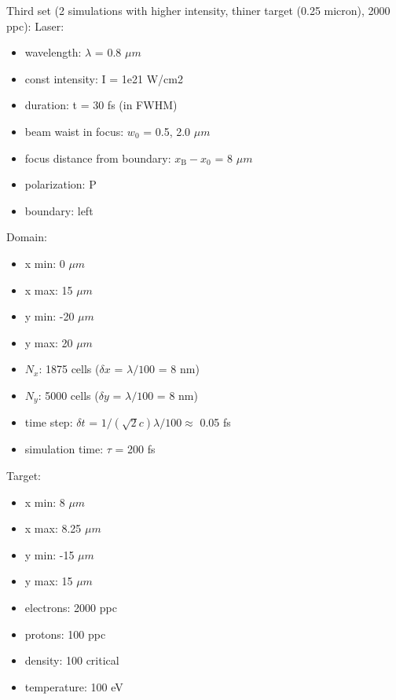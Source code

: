 \noindent
Third set (2 simulations with higher intensity, thiner target (0.25 micron), 2000 ppc):
\noindent
Laser:
\begin{itemize}
	\item wavelength: $ \lambda $ = 0.8 $ \mu m $
	\item const intensity: I = 1e21 W/cm2
	\item duration: t = 30 fs (in FWHM)
	\item beam waist in focus: $ w_0 $ = 0.5, 2.0 $ \mu m $
	\item focus distance from boundary: $ x_\mathrm{B} - x_0 $ = 8 $ \mu m $
	\item polarization: P
	\item boundary: left 
\end{itemize}
Domain:
\begin{itemize}
	\item x min: 0 $ \mu m $
	\item x max: 15 $ \mu m $
	\item y min: -20 $ \mu m $
	\item y max: 20 $ \mu m $
	\item $ N_x $: 1875 cells ($ \delta x $ = $ \lambda/100 $ = 8 nm)
	\item $ N_y $: 5000 cells ($ \delta y $ = $ \lambda/100 $ = 8 nm)
	\item time step: $ \delta t $ = $ 1/(\sqrt{2} c) \lambda /100 \approx $ 0.05 fs 
	\item simulation time: $ \tau $ = 200 fs
\end{itemize}
Target:
\begin{itemize}
	\item x min: 8 $ \mu m $
	\item x max: 8.25 $ \mu m $
	\item y min: -15 $ \mu m $
	\item y max: 15 $ \mu m $
	\item electrons: 2000 ppc
	\item protons: 100 ppc
	\item density: 100 critical
	\item temperature: 100 eV
\end{itemize}

